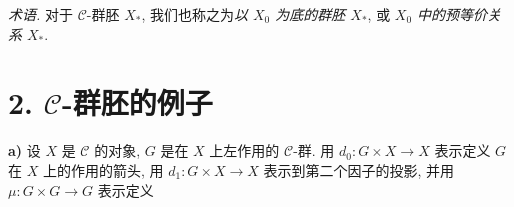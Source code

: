 \medskip
{}\label{sga3:exp5:terminology:c-groupoid}
\noindent\textit{术语.} 对于 \(\mathscr C\)-群胚 \(X_\ast\),
我们也称之为\emph{以 \(X_0\) 为底的群胚 \(X_\ast\)},
或 \emph{\(X_0\) 中的预等价关系 \(X_\ast\)}.

\section*{2. \(\mathscr C\)-群胚的例子}
\label{sec:sga3-V-2}

\label{par:sga3-V-2-a}%
\noindent\textbf{a)} 设 \(X\) 是 \(\mathscr C\) 的对象,
\(G\) 是在 \(X\) 上左作用的 \(\mathscr C\)-群.
用 \(d_0:G\times X\to X\) 表示定义 \(G\) 在 \(X\) 上的作用的箭头,
用 \(d_1:G\times X\to X\) 表示到第二个因子的投影,
并用 \(\mu:G\times G\to G\) 表示定义
